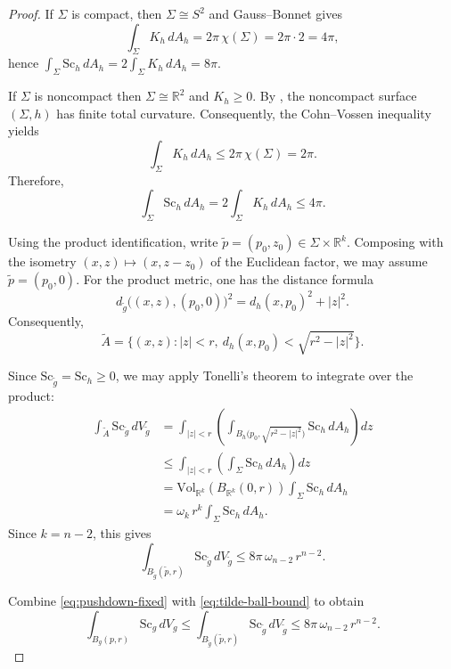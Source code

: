\documentclass[12pt,oneside,a4paper]{article}
\theoremstyle{mytheorem}
\theoremstyle{remark}
\begin{document}
\begin{proof}
If $\Sigma$ is compact, then $\Sigma\cong S^2$ and Gauss--Bonnet gives
\[
\int_\Sigma K_h\,dA_h = 2\pi\,\chi(\Sigma)=2\pi\cdot 2=4\pi,
\]
hence $\int_\Sigma \mathrm{Sc}_h\,dA_h = 2\int_\Sigma K_h\,dA_h = 8\pi$.


If $\Sigma$ is noncompact then $\Sigma\cong \mathbb R^2$ and $K_h\ge 0$. By \cite[Theorem~2.1]{2016arXiv160907631C}, the noncompact surface $(\Sigma,h)$ has finite total curvature. Consequently, the Cohn--Vossen inequality yields
\[
\int_{\Sigma} K_h\,dA_h \le 2\pi\,\chi(\Sigma)=2\pi.
\]
Therefore,
\[
\int_\Sigma \mathrm{Sc}_h\,dA_h = 2\int_\Sigma K_h\,dA_h \le 4\pi.
\]

Using the product identification, write $\widetilde p=(p_0,z_0)\in \Sigma\times\mathbb R^k$.
Composing with the isometry $(x,z)\mapsto (x,z-z_0)$ of the Euclidean factor,
we may assume $\widetilde p=(p_0,0)$. For the product metric, one has the distance formula
\begin{equation*}
d_{\widetilde g}\bigl((x,z),(p_0,0)\bigr)^2
=
d_h(x,p_0)^2 + |z|^2.
\end{equation*}
Consequently,
\[
\widetilde A
=
\bigl\{(x,z): |z|<r,\ d_h(x,p_0)<\sqrt{r^2-|z|^2}\bigr\}.
\]

Since $\mathrm{Sc}_{\widetilde g}=\mathrm{Sc}_h\ge 0$, we may apply Tonelli's
theorem to integrate over the product:
\begin{align*}
\int_{\widetilde A}\mathrm{Sc}_{\widetilde g}\,dV_{\widetilde g}
&=
\int_{|z|<r}\left(\int_{B_h\bigl(p_0,\sqrt{r^2-|z|^2}\bigr)} \mathrm{Sc}_h\,dA_h\right)dz \\
&\le
\int_{|z|<r}\left(\int_{\Sigma}\mathrm{Sc}_h\,dA_h\right)dz \\
&=
\mathrm{Vol}_{\mathbb R^k}(B_{\mathbb R^k}(0,r)) \int_{\Sigma}\mathrm{Sc}_h\,dA_h \\
&=
\omega_k\,r^k \int_{\Sigma}\mathrm{Sc}_h\,dA_h.
\end{align*}
Since $k=n-2$, this gives
\begin{equation}\label{eq:tilde-ball-bound}
\int_{B_{\widetilde g}(\widetilde p,r)}\mathrm{Sc}_{\widetilde g}\,dV_{\widetilde g}
\le 8\pi\,\omega_{n-2}\,r^{n-2}.
\end{equation}


Combine \eqref{eq:pushdown-fixed} with \eqref{eq:tilde-ball-bound} to obtain
\[
\int_{B_g(p,r)} \mathrm{Sc}_g\,dV_g
\le
\int_{B_{\widetilde g}(\widetilde p,r)}\mathrm{Sc}_{\widetilde g}\,dV_{\widetilde g}
\le
8\pi\,\omega_{n-2}\,r^{n-2}.
\]
\end{proof}
\end{document}
